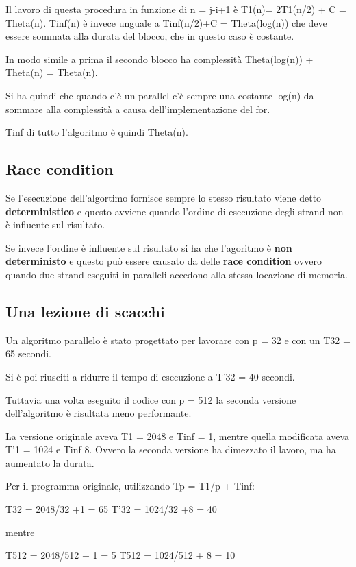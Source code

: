 Il lavoro di questa procedura in funzione di n = j-i+1 è T1(n)= 2T1(n/2)
+ C = Theta(n). Tinf(n) è invece unguale a Tinf(n/2)+C = Theta(log(n))
che deve essere sommata alla durata del blocco, che in questo caso è
costante.

In modo simile a prima il secondo blocco ha complessità Theta(log(n)) +
Theta(n) = Theta(n).

Si ha quindi che quando c'è un parallel c'è sempre una costante log(n)
da sommare alla complessità a causa dell'implementazione del for.

Tinf di tutto l'algoritmo è quindi Theta(n).

\subsection{Race condition}\label{race-condition}

Se l'esecuzione dell'algortimo fornisce sempre lo stesso risultato viene
detto \textbf{deterministico} e questo avviene quando l'ordine di
esecuzione degli strand non è influente sul risultato.

Se invece l'ordine è influente sul risultato si ha che l'agoritmo è
\textbf{non deterministo} e questo può essere causato da delle
\textbf{race condition} ovvero quando due strand eseguiti in paralleli
accedono alla stessa locazione di memoria.

\subsection{Una lezione di scacchi}\label{una-lezione-di-scacchi}

Un algoritmo parallelo è stato progettato per lavorare con p = 32 e con
un T32 = 65 secondi.

Si è poi riusciti a ridurre il tempo di esecuzione a T'32 = 40 secondi.

Tuttavia una volta eseguito il codice con p = 512 la seconda versione
dell'algoritmo è risultata meno performante.

La versione originale aveva T1 = 2048 e Tinf = 1, mentre quella
modificata aveva T'1 = 1024 e Tinf 8. Ovvero la seconda versione ha
dimezzato il lavoro, ma ha aumentato la durata.

Per il programma originale, utilizzando Tp = T1/p + Tinf:

T32 = 2048/32 +1 = 65 T'32 = 1024/32 +8 = 40

mentre

T512 = 2048/512 + 1 = 5 T512 = 1024/512 + 8 = 10

